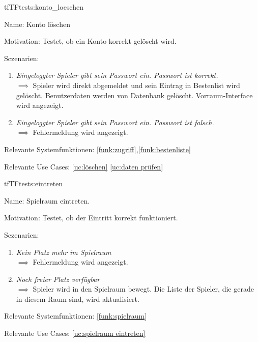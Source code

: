 \begin{description}[leftmargin=5em, style=sameline]
\begin{lhp}{tf}{TF}{tests:konto_loeschen}
	\item [Name:] Konto löschen
	\item [Motivation:] Testet, ob ein Konto korrekt gelöscht wird.
	\item [Sczenarien:] \hfill
		\begin{enumerate}
			\item \textit{Eingeloggter Spieler gibt sein Passwort ein. Passwort ist korrekt.} \\ $\implies$ Spieler wird direkt abgemeldet und sein Eintrag in Bestenlist wird gelöscht. Benutzerdaten werden von Datenbank gelöscht. Vorraum-Interface wird angezeigt.  
			\item \textit{Eingeloggter Spieler gibt sein Passwort ein. Passwort ist falsch.} \\ $\implies$ Fehlermeldung wird angezeigt. 
		\end{enumerate}
	\item [Relevante Systemfunktionen:] \ref{funk:zugriff},\ref{funk:bestenliste}
	\item [Relevante Use Cases:] \ref{uc:löschen} \ref{uc:daten prüfen}
\end{lhp}

\begin{lhp}{tf}{TF}{tests:eintreten}
	\item [Name:] Spielraum eintreten.
	\item [Motivation:] Testet, ob der Eintritt korrekt funktioniert.
	\item [Sczenarien:] \hfill
		\begin{enumerate}
			\item \textit{Kein Platz mehr im Spielraum} \\ $\implies$ Fehlermeldung wird angezeigt.
			\item \textit{Noch freier Platz verfügbar} \\ $\implies$ Spieler wird in den Spielraum bewegt. Die Liste der Spieler, die gerade in diesem Raum sind, wird aktualisiert.
		\end{enumerate}
	\item [Relevante Systemfunktionen:] \ref{funk:spielraum}
	\item [Relevante Use Cases:] \ref{uc:spielraum eintreten}
\end{lhp}


\end{description}

